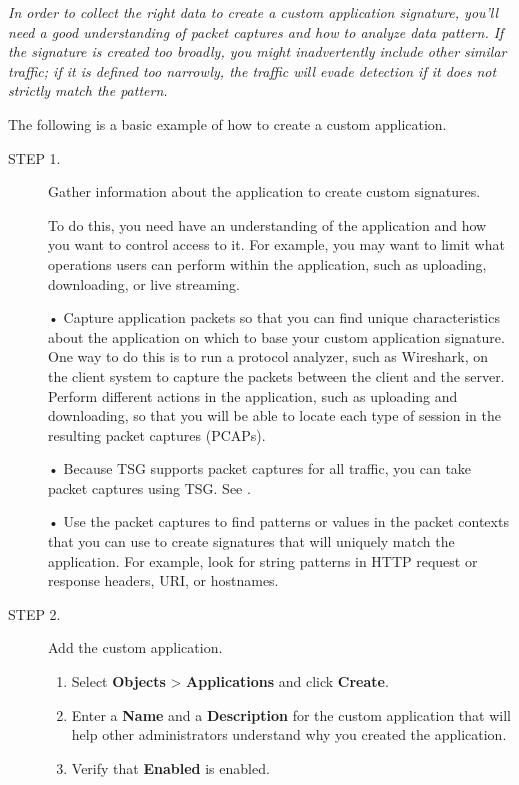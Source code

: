 \notemark\textit{In order to collect the right data to create a custom application signature, you'll need a good understanding of packet captures and how to analyze data pattern. If the signature is created too broadly, you might inadvertently include other similar traffic; if it is defined too narrowly, the traffic will evade detection if it does not strictly match the pattern.}


The following is a basic example of how to create a custom application.

\begin{description}
    \item[STEP 1.]	Gather information about the application to create custom signatures.


    To do this, you need have an understanding of the application and how you want to control access to it. For example, you may want to limit what operations users can perform within the application, such as uploading, downloading, or live streaming.


    • Capture application packets so that you can find unique characteristics about the application on which to base your custom application signature. One way to do this is to run a protocol analyzer, such as Wireshark, on the client system to capture the packets between the client and the server. Perform different actions in the application, such as uploading and downloading, so that you will be able to locate each type of session in the resulting packet captures (PCAPs).


    • Because TSG supports packet captures for all traffic, you can take packet captures using TSG. See \hyperlink{link:Take Packet Captures}{\color{linkblue}{Take Packet Captures}}.


    • Use the packet captures to find patterns or values in the packet contexts that you can use to create signatures that will uniquely match the application. For example, look for string patterns in HTTP request or response headers, URI, or hostnames.
    \item[STEP 2.]	Add the custom application.
    \begin{enumerate}  
        \item Select \textbf{Objects} > \textbf{Applications} and click \textbf{Create}.
        \item Enter a \textbf{Name} and a \textbf{Description} for the custom application that will help other administrators understand why you created the application.
        \item Verify that \textbf{Enabled} is enabled.
        


\end{enumerate}
\end{description}
